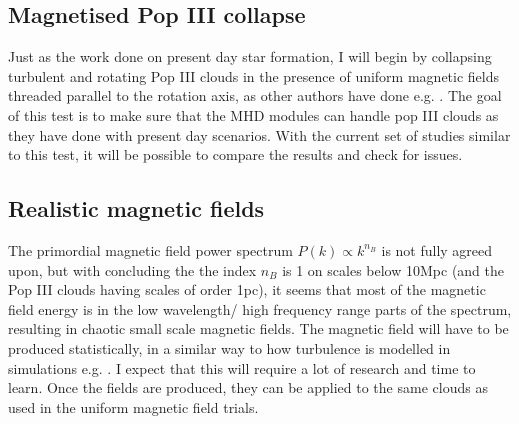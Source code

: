 \documentclass[11pt]{article}
\begin{document}
\subsection{Magnetised Pop III collapse}
Just as the work done on present day star formation, I will begin by collapsing turbulent and rotating Pop III clouds in the presence of uniform magnetic fields threaded parallel to the rotation axis, as other authors have done e.g. \cite{Machida2008a}. The goal of this test is to make sure that the MHD modules can handle pop III clouds as they have done with present day scenarios. With the current set of studies similar to this test, it will be possible to compare the results and check for  issues.

\subsection{Realistic magnetic fields}
The primordial magnetic field power spectrum $P(k) \propto k^{n_B}$ is not fully agreed upon, but with \cite{Ichiki2006} concluding the the index $n_B$ is 1 on scales below 10Mpc (and the Pop III clouds having scales of order 1pc), it seems that most of the magnetic field energy is in the low wavelength/ high frequency range parts of the spectrum, resulting in chaotic small scale magnetic fields. The magnetic field will have to be produced statistically, in a similar way to how turbulence is modelled in simulations e.g. \cite{Lomax2015}. I expect that this will require a lot of research and time to learn. Once the fields are produced, they can be applied to the same clouds as used in the uniform magnetic field trials.




\end{document}
